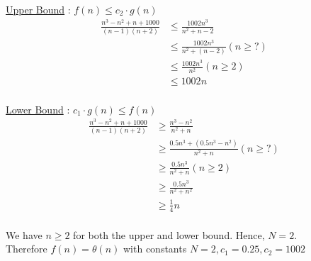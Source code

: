 \begin{prob}
\begin{subprobset}
\begin{subprob}
\begin{soln}
                \underline{Upper Bound} :  $f(n) \leq c_2 \cdot g(n)$ \\

                \begin{align*}
                \frac{n^3-n^2 + n + 1000}{(n-1)(n+2)}
                & \le \frac{1002n^3}{n^2 + n - 2}\\
                & \le \frac{1002n^3}{n^2 + (n - 2)} (n \ge ?) \\
                & \le \frac{1002n^3}{n^2} (n \ge 2) \\
                & \le 1002n \\
                \end{align*}


                \underline{Lower Bound} : $c_1 \cdot g(n) \leq f(n)$ \\

                \begin{align*}
                \frac{n^3-n^2 + n + 1000}{(n-1)(n+2)}
                & \ge \frac{n^3-n^2}{n^2 + n}\\
                & \ge \frac{0.5n^3 + (0.5n^3 -n^2)}{n^2 + n} (n \ge ?) \\
                & \ge \frac{0.5n^3}{n^2 + n} (n \ge 2) \\
                & \ge \frac{0.5n^3}{n^2 + n^2} \\
                & \ge \frac{1}{4}n \\
                \end{align*}

                We have $n \ge 2 $ for both the upper and lower bound. Hence, $N=2$. \\
                Therefore $f(n) = \theta(n)$ with constants $N=2, c_1 = 0.25, c_2 = 1002$
            \end{soln}
        \end{subprob}

    \end{subprobset}
\end{prob}
